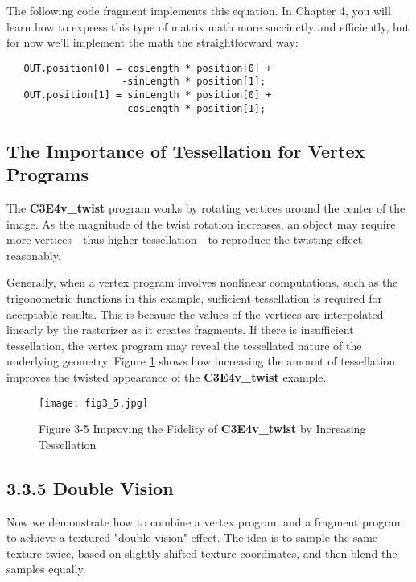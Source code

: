 \documentclass[../main.tex]{subfiles}
\begin{document}
The following code fragment implements this equation. In Chapter 4, you will learn how to express this type of matrix math more succinctly and efficiently, but for now we'll implement the math the straightforward way:

\FloatBarrier
\begin{lstlisting}
   OUT.position[0] = cosLength * position[0] +
                    -sinLength * position[1];
   OUT.position[1] = sinLength * position[0] +
                     cosLength * position[1];
\end{lstlisting}
\FloatBarrier

\subsection*{The Importance of Tessellation for Vertex Programs}

The \textbf{C3E4v_twist} program works by rotating vertices around the center of the image. As the magnitude of the twist rotation increases, an object may require more vertices—thus higher tessellation—to reproduce the twisting effect reasonably.

Generally, when a vertex program involves nonlinear computations, such as the trigonometric functions in this example, sufficient tessellation is required for acceptable results. This is because the values of the vertices are interpolated linearly by the rasterizer as it creates fragments. If there is insufficient tessellation, the vertex program may reveal the tessellated nature of the underlying geometry. Figure \ref{fig:3-5} shows how increasing the amount of tessellation improves the twisted appearance of the \textbf{C3E4v_twist} example.

\begin{figure}
    \centering
    \texttt{[image: fig3\_5.jpg]}
    \caption{Figure 3-5 Improving the Fidelity of \textbf{C3E4v_twist} by Increasing Tessellation}
    \label{fig:3-5}
\end{figure}

\subsection{3.3.5 Double Vision}

Now we demonstrate how to combine a vertex program and a fragment program to achieve a textured "double vision" effect. The idea is to sample the same texture twice, based on slightly shifted texture coordinates, and then blend the samples equally.
\end{document}
